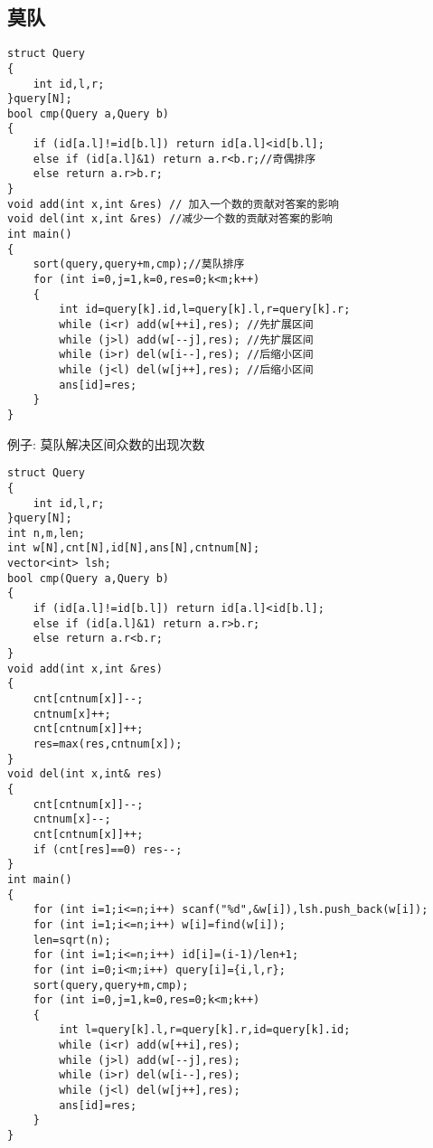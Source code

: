 \documentclass[a4paper]{ctexart}
\begin{document}
\subsection{莫队}
\begin{lstlisting}
struct Query
{
    int id,l,r;
}query[N];
bool cmp(Query a,Query b)
{
    if (id[a.l]!=id[b.l]) return id[a.l]<id[b.l];
    else if (id[a.l]&1) return a.r<b.r;//奇偶排序
    else return a.r>b.r;
}
void add(int x,int &res) // 加入一个数的贡献对答案的影响
void del(int x,int &res) //减少一个数的贡献对答案的影响
int main()
{
    sort(query,query+m,cmp);//莫队排序
    for (int i=0,j=1,k=0,res=0;k<m;k++)
    {
        int id=query[k].id,l=query[k].l,r=query[k].r;
        while (i<r) add(w[++i],res); //先扩展区间
        while (j>l) add(w[--j],res); //先扩展区间
        while (i>r) del(w[i--],res); //后缩小区间
        while (j<l) del(w[j++],res); //后缩小区间
        ans[id]=res;
    }
}
\end{lstlisting}
例子: 莫队解决区间众数的出现次数
\begin{lstlisting}
struct Query
{
    int id,l,r;
}query[N];
int n,m,len;
int w[N],cnt[N],id[N],ans[N],cntnum[N];
vector<int> lsh;
bool cmp(Query a,Query b)
{
    if (id[a.l]!=id[b.l]) return id[a.l]<id[b.l];
    else if (id[a.l]&1) return a.r>b.r;
    else return a.r<b.r;
}
void add(int x,int &res)
{
    cnt[cntnum[x]]--;
    cntnum[x]++;
    cnt[cntnum[x]]++;
    res=max(res,cntnum[x]);
}
void del(int x,int& res)
{
    cnt[cntnum[x]]--;
    cntnum[x]--;
    cnt[cntnum[x]]++;
    if (cnt[res]==0) res--;
}
int main()
{
    for (int i=1;i<=n;i++) scanf("%d",&w[i]),lsh.push_back(w[i]);
    for (int i=1;i<=n;i++) w[i]=find(w[i]);
    len=sqrt(n);
    for (int i=1;i<=n;i++) id[i]=(i-1)/len+1;
    for (int i=0;i<m;i++) query[i]={i,l,r};
    sort(query,query+m,cmp);
    for (int i=0,j=1,k=0,res=0;k<m;k++)
    {
        int l=query[k].l,r=query[k].r,id=query[k].id;
        while (i<r) add(w[++i],res);
        while (j>l) add(w[--j],res);
        while (i>r) del(w[i--],res);
        while (j<l) del(w[j++],res);
        ans[id]=res;
    }
}
\end{lstlisting}
\end{document}
